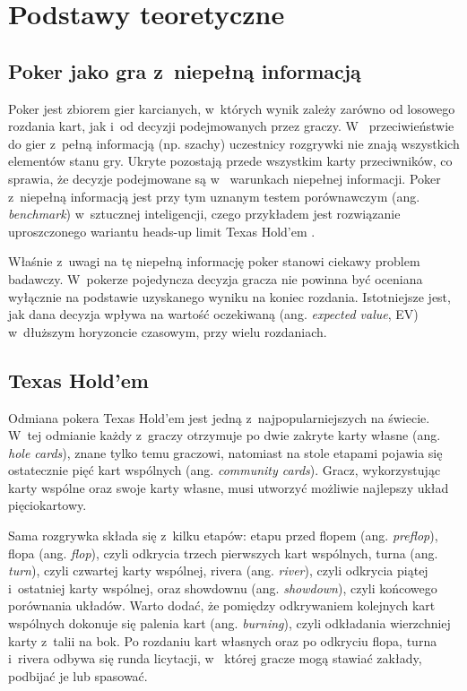 \chapter{Podstawy teoretyczne}
\label{chap:podstawy-teoretyczne}

\section{Poker jako gra z~niepełną informacją}

Poker jest zbiorem gier karcianych, w~których wynik zależy zarówno od
losowego rozdania kart, jak i~od decyzji podejmowanych przez graczy. W~
przeciwieństwie do gier z~pełną informacją (np. szachy) uczestnicy
rozgrywki nie znają wszystkich elementów stanu gry. Ukryte pozostają przede
wszystkim karty przeciwników, co sprawia, że decyzje podejmowane są w~
warunkach niepełnej informacji. Poker z~niepełną informacją jest przy tym
uznanym testem porównawczym (ang. \emph{benchmark}) w~sztucznej inteligencji, czego przykładem
jest rozwiązanie uproszczonego wariantu heads-up limit Texas Hold'em
\cite{bowling_heads_up_2015}.

Właśnie z~uwagi na tę niepełną informację poker stanowi ciekawy
problem badawczy. W~pokerze pojedyncza decyzja gracza nie powinna być
oceniana wyłącznie na podstawie uzyskanego wyniku na koniec rozdania.
Istotniejsze jest, jak dana decyzja wpływa na wartość oczekiwaną
(ang. \emph{expected value}, EV) w~dłuższym horyzoncie czasowym, przy
wielu rozdaniach.


\section{Texas Hold’em}

Odmiana pokera Texas Hold’em jest jedną z~najpopularniejszych na świecie.
W~tej odmianie każdy z~graczy otrzymuje po dwie zakryte karty własne (ang.
\emph{hole cards}), znane tylko temu graczowi, natomiast na stole etapami
pojawia się ostatecznie pięć kart wspólnych (ang. \emph{community cards}).
Gracz, wykorzystując karty wspólne oraz swoje karty własne, musi utworzyć
możliwie najlepszy układ pięciokartowy.

Sama rozgrywka składa się z~kilku etapów: etapu przed flopem (ang.
\emph{preflop}), flopa (ang. \emph{flop}), czyli odkrycia trzech
pierwszych kart wspólnych, turna (ang. \emph{turn}), czyli czwartej karty
wspólnej, rivera (ang. \emph{river}), czyli odkrycia piątej i~ostatniej
karty wspólnej, oraz showdownu (ang. \emph{showdown}), czyli końcowego
porównania układów. Warto dodać, że pomiędzy odkrywaniem kolejnych kart
wspólnych dokonuje się palenia kart (ang. \emph{burning}), czyli
odkładania wierzchniej karty z~talii na bok. Po rozdaniu kart własnych
oraz po odkryciu flopa, turna i~rivera odbywa się runda licytacji, w~
której gracze mogą stawiać zakłady, podbijać je lub spasować.

